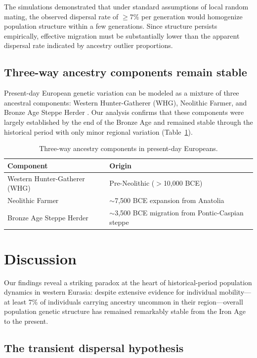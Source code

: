 \documentclass[11pt]{article}
\begin{document}
The simulations demonstrated that under standard assumptions of local random mating, the observed dispersal rate of $\geq$7\% per generation would homogenize population structure within a few generations. Since structure persists empirically, effective migration must be substantially lower than the apparent dispersal rate indicated by ancestry outlier proportions.

\subsection{Three-way ancestry components remain stable}

Present-day European genetic variation can be modeled as a mixture of three ancestral components: Western Hunter-Gatherer (WHG), Neolithic Farmer, and Bronze Age Steppe Herder \citep{Lazaridis2014,Haak2015}. Our analysis confirms that these components were largely established by the end of the Bronze Age and remained stable through the historical period with only minor regional variation (Table~\ref{tab:ancestry}).

\begin{table}[ht]
\centering
\caption{Three-way ancestry components in present-day Europeans.}
\label{tab:ancestry}
\begin{tabular}{ll}
\toprule
Component & Origin \\
\midrule
Western Hunter-Gatherer (WHG) & Pre-Neolithic ($>$10,000 BCE) \\
Neolithic Farmer & $\sim$7,500 BCE expansion from Anatolia \\
Bronze Age Steppe Herder & $\sim$3,500 BCE migration from Pontic-Caspian steppe \\
\bottomrule
\end{tabular}
\end{table}

\section{Discussion}

Our findings reveal a striking paradox at the heart of historical-period population dynamics in western Eurasia: despite extensive evidence for individual mobility---at least 7\% of individuals carrying ancestry uncommon in their region---overall population genetic structure has remained remarkably stable from the Iron Age to the present.

\subsection{The transient dispersal hypothesis}
\end{document}
